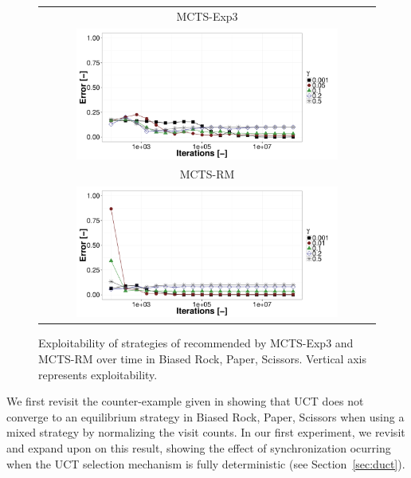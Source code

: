 \begin{figure}[t!]
\centering
\begin{tabular}{c}
{\small MCTS-Exp3} \\
\includegraphics[width=0.8\textwidth]{figures/brps-MCTS-EXP3.pdf} \\
{\small MCTS-RM} \\
\includegraphics[width=0.8\textwidth]{figures/brps-MCTS-RM.pdf} \\
\end{tabular}
\caption{Exploitability of strategies of recommended by MCTS-Exp3 and MCTS-RM over time in Biased Rock, Paper, Scissors. Vertical axis represents exploitability. }
\label{fig:expl-brps2}
\end{figure}

We first revisit the counter-example given in \cite{Shafiei09} showing that 
UCT does not converge to an equilibrium strategy in Biased Rock, Paper, Scissors 
when using a mixed strategy by normalizing the visit counts.
In our first experiment, we revisit and expand upon on this result, showing the effect of synchronization ocurring when the UCT selection mechanism is fully deterministic (see Section~\ref{sec:duct}).

